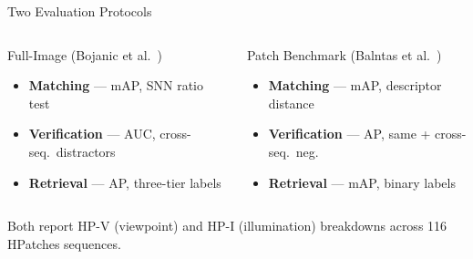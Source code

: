 \documentclass[aspectratio=169, 12pt]{beamer}
\begin{document}
\begin{frame}{Two Evaluation Protocols}
  \vspace{-0.5em}
  \begin{columns}[T]
    \begin{block}{\small Full-Image (Bojanic et al.~\cite{bojanic2020comparison})}
      {\small
      \begin{itemize}\setlength{\itemsep}{0pt}
        \item \textbf{Matching} --- mAP, SNN ratio test
        \item \textbf{Verification} --- AUC, cross-seq.\ distractors
        \item \textbf{Retrieval} --- AP, three-tier labels
      \end{itemize}}
    \end{block}
    \begin{block}{\small Patch Benchmark (Balntas et al.~\cite{balntas2017hpatches})}
      {\small
      \begin{itemize}\setlength{\itemsep}{0pt}
        \item \textbf{Matching} --- mAP, descriptor distance
        \item \textbf{Verification} --- AP, same + cross-seq.\ neg.
        \item \textbf{Retrieval} --- mAP, binary labels
      \end{itemize}}
    \end{block}
  \end{columns}
  \vfill
  {\small Both report HP-V (viewpoint) and HP-I (illumination) breakdowns across 116 HPatches sequences.}
\end{frame}
\end{document}

